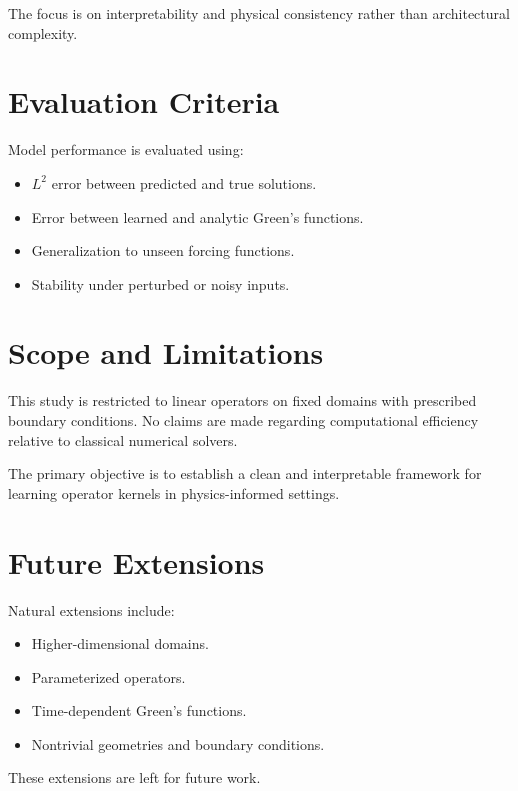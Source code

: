 \documentclass[11pt]{article}
\begin{document}
The focus is on interpretability and physical consistency rather than architectural
complexity.

\section{Evaluation Criteria}

Model performance is evaluated using:
\begin{itemize}
\item $L^2$ error between predicted and true solutions.
\item Error between learned and analytic Green's functions.
\item Generalization to unseen forcing functions.
\item Stability under perturbed or noisy inputs.
\end{itemize}

\section{Scope and Limitations}

This study is restricted to linear operators on fixed domains with prescribed
boundary conditions. No claims are made regarding computational efficiency relative
to classical numerical solvers.

The primary objective is to establish a clean and interpretable framework for
learning operator kernels in physics-informed settings.

\section{Future Extensions}

Natural extensions include:
\begin{itemize}
\item Higher-dimensional domains.
\item Parameterized operators.
\item Time-dependent Green's functions.
\item Nontrivial geometries and boundary conditions.
\end{itemize}

These extensions are left for future work.

\end{document}
